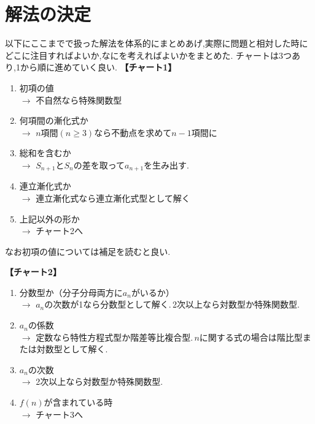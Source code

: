 
    \section{解法の決定}
      以下にここまでで扱った解法を体系的にまとめあげ,実際に問題と相対した時にどこに注目すればよいか,なにを考えればよいかをまとめた.
      チャートは3つあり,1から順に進めていく良い.
      \noindent \textbf{【チャート1】}
      \begin{enumerate}
        \item 初項の値\\
              $\rightarrow$ 不自然なら特殊関数型
        \item 何項間の漸化式か\\
              $\rightarrow$ $n$項間$(n\ge3)$なら不動点を求めて$n-1$項間に
        \item 総和を含むか\\
              $\rightarrow$ $S_{n+1}$と$S_n$の差を取って$a_{n+1}$を生み出す.
        \item 連立漸化式か\\
              $\rightarrow$ 連立漸化式なら連立漸化式型として解く
        \item 上記以外の形か\\
              $\rightarrow$ チャート2へ
      \end{enumerate}
      なお初項の値については補足を読むと良い.

      \noindent \textbf{【チャート2】}
      \begin{enumerate}
          \item 分数型か（分子分母両方に$a_n$がいるか）\\
                $\rightarrow$ $a_n$の次数が1なら分数型として解く.\,2次以上なら対数型か特殊関数型.
          \item $a_n$の係数\\
                $\rightarrow$ 定数なら特性方程式型か階差等比複合型.\,$n$に関する式の場合は階比型または対数型として解く.
          \item $a_n$の次数\\
                $\rightarrow$ 2次以上なら対数型か特殊関数型.
          \item $f(n)$が含まれている時\\
                $\rightarrow$ チャート3へ
      \end{enumerate}

